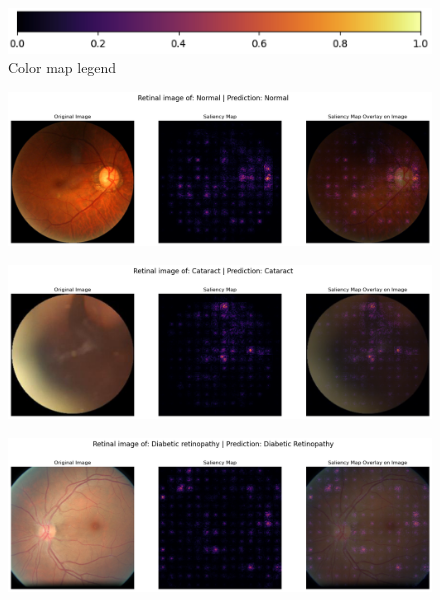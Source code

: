 \documentclass[sigconf]{acmart}
\begin{document}
\begin{figure}[]
  \centering
  \includegraphics[width=\linewidth]{samples/resources/saliency maps/color map legend.png}
  \caption{Color map legend}
\end{figure}

\begin{figure}[]
  \centering
  \includegraphics[width=\linewidth]{samples/resources/saliency maps/retinal_normal.png}
\end{figure}

\begin{figure}[]
  \centering
  \includegraphics[width=\linewidth]{samples/resources/saliency maps/retinal_cataract.png}
\end{figure}

\begin{figure}[]
  \centering
  \includegraphics[width=\linewidth]{samples/resources/saliency maps/retinal_diabetic.png}
\end{figure}
\end{document}
